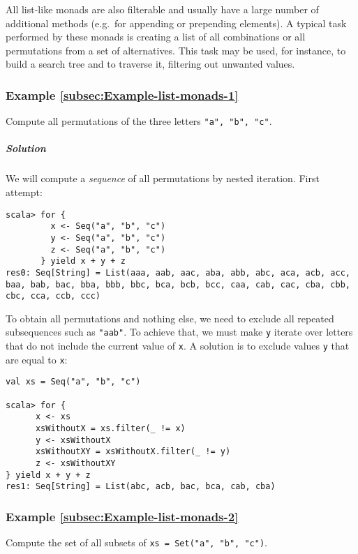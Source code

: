 All list-like monads are also filterable and usually have a large
number of additional methods (e.g.~for appending or prepending elements).
A typical task performed by these monads is creating a list of all
combinations or all permutations from a set of alternatives. This
task may be used, for instance, to build a search tree and to traverse
it, filtering out unwanted values.

\subsubsection{Example \label{subsec:Example-list-monads-1}\ref{subsec:Example-list-monads-1}}

Compute all permutations of the three letters \lstinline!"a", "b", "c"!. 

\subparagraph{Solution}

We will compute a \emph{sequence} of all permutations by nested iteration.
First attempt:
\begin{lstlisting}
scala> for {
         x <- Seq("a", "b", "c")
         y <- Seq("a", "b", "c")
         z <- Seq("a", "b", "c")
       } yield x + y + z
res0: Seq[String] = List(aaa, aab, aac, aba, abb, abc, aca, acb, acc, baa, bab, bac, bba, bbb, bbc, bca, bcb, bcc, caa, cab, cac, cba, cbb, cbc, cca, ccb, ccc)
\end{lstlisting}
To obtain all permutations and nothing else, we need to exclude all
repeated subsequences such as \lstinline!"aab"!. To achieve that,
we must make \lstinline!y! iterate over letters that do not include
the current value of \lstinline!x!. A solution is to exclude values
\lstinline!y! that are equal to \lstinline!x!:
\begin{lstlisting}
val xs = Seq("a", "b", "c")

scala> for {
      x <- xs
      xsWithoutX = xs.filter(_ != x)
      y <- xsWithoutX
      xsWithoutXY = xsWithoutX.filter(_ != y)
      z <- xsWithoutXY
} yield x + y + z
res1: Seq[String] = List(abc, acb, bac, bca, cab, cba) 
\end{lstlisting}


\subsubsection{Example \label{subsec:Example-list-monads-2}\ref{subsec:Example-list-monads-2}}

Compute the set of all subsets of \lstinline!xs = Set("a", "b", "c")!. 

